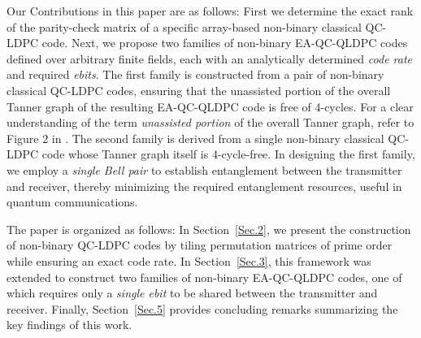 \documentclass[conference]{IEEEtran}
\begin{document}
Our Contributions in this paper are as follows: First we determine the exact rank of the parity-check matrix of a specific  array-based non-binary classical QC-LDPC code. Next, we propose two families of non-binary EA-QC-QLDPC codes defined over arbitrary finite fields, each with an analytically determined \textit{code rate} and required \textit{ebits}. The first family is constructed from a pair of non-binary classical QC-LDPC codes, ensuring that the unassisted portion of the overall Tanner graph of the resulting EA-QC-QLDPC code is free of 4-cycles. For a clear understanding of the term \textit{unassisted portion} of the overall Tanner graph, refer to Figure 2 in \cite{kumar2024entanglement}. The second family is derived from a single non-binary classical QC-LDPC code whose Tanner graph itself is 4-cycle-free. In designing the first family, we employ a \emph{single Bell pair} to establish entanglement between the transmitter and receiver, thereby minimizing the required entanglement resources, useful in quantum communications.



The paper is organized as follows: In Section~\ref{Sec.2}, we present the construction of non-binary QC-LDPC codes by tiling permutation matrices of prime order while ensuring an exact code rate. In Section~\ref{Sec.3}, this framework was extended to construct two families of non-binary EA-QC-QLDPC codes, one of which requires only a \emph{single ebit} to be shared between the transmitter and receiver. Finally, Section~\ref{Sec.5} provides concluding remarks summarizing the key findings of this work.
\end{document}

